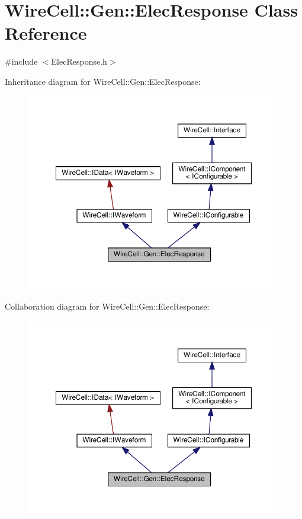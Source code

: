 \hypertarget{class_wire_cell_1_1_gen_1_1_elec_response}{}\section{Wire\+Cell\+:\+:Gen\+:\+:Elec\+Response Class Reference}
\label{class_wire_cell_1_1_gen_1_1_elec_response}


{\ttfamily \#include $<$Elec\+Response.\+h$>$}



Inheritance diagram for Wire\+Cell\+:\+:Gen\+:\+:Elec\+Response\+:
\nopagebreak
\begin{figure}[H]
\begin{center}
\leavevmode
\includegraphics[width=350pt]{class_wire_cell_1_1_gen_1_1_elec_response__inherit__graph}
\end{center}
\end{figure}


Collaboration diagram for Wire\+Cell\+:\+:Gen\+:\+:Elec\+Response\+:
\nopagebreak
\begin{figure}[H]
\begin{center}
\leavevmode
\includegraphics[width=350pt]{class_wire_cell_1_1_gen_1_1_elec_response__coll__graph}
\end{center}
\end{figure}

